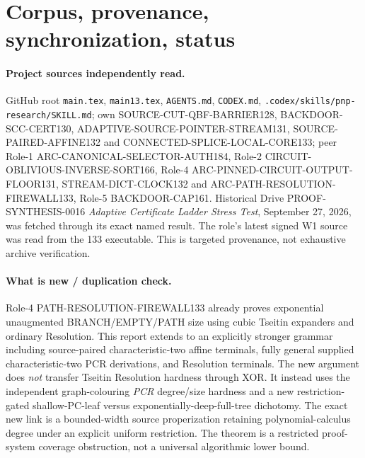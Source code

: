 \documentclass[11pt]{article}
\begin{document}
\section{Corpus, provenance, synchronization, status}\paragraph{Project sources independently read.}
GitHub root \texttt{main.tex}, \texttt{main13.tex}, \texttt{AGENTS.md}, \texttt{CODEX.md}, \texttt{.codex/skills/pnp-research/SKILL.md}; own SOURCE-CUT-QBF-BARRIER128, BACKDOOR-SCC-CERT130, ADAPTIVE-SOURCE-POINTER-STREAM131, SOURCE-PAIRED-AFFINE132 and CONNECTED-SPLICE-LOCAL-CORE133; peer Role-1 ARC-CANONICAL-SELECTOR-AUTH184, Role-2 CIRCUIT-OBLIVIOUS-INVERSE-SORT166, Role-4 ARC-PINNED-CIRCUIT-OUTPUT-FLOOR131, STREAM-DICT-CLOCK132 and ARC-PATH-RESOLUTION-FIREWALL133, Role-5 BACKDOOR-CAP161. Historical Drive PROOF-SYNTHESIS-0016 \emph{Adaptive Certificate Ladder Stress Test}, September 27, 2026, was fetched through its exact named result. The role's latest signed W1 source was read from the 133 executable. This is targeted provenance, not exhaustive archive verification.

\paragraph{What is new / duplication check.} Role-4 PATH-RESOLUTION-FIREWALL133 already proves exponential unaugmented BRANCH/EMPTY/PATH size using cubic Tseitin expanders and ordinary Resolution. This report extends to an explicitly stronger grammar including source-paired characteristic-two affine terminals, fully general supplied characteristic-two PCR derivations, and Resolution terminals. The new argument does \emph{not} transfer Tseitin Resolution hardness through XOR. It instead uses the independent graph-colouring \emph{PCR} degree/size hardness and a new restriction-gated shallow-PC-leaf versus exponentially-deep-full-tree dichotomy. The exact new link is a bounded-width source properization retaining polynomial-calculus degree under an explicit uniform restriction. The theorem is a restricted proof-system coverage obstruction, not a universal algorithmic lower bound.
\end{document}
